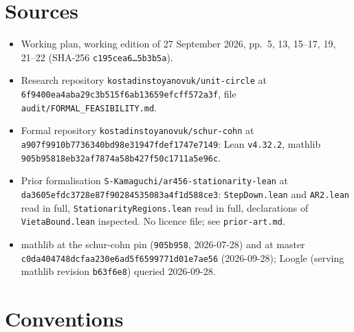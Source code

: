 \section{Sources}

\begin{itemize}
\item Working plan, working edition of 27 September 2026, pp.~5, 13, 15--17, 19,
  21--22 (SHA-256 \texttt{c195cea6\ldots5b3b5a}).
\item Research repository \texttt{kostadinstoyanovuk/unit-circle} at
  \texttt{6f9400ea4aba29c3b515f6ab13659efcff572a3f}, file
  \texttt{audit/FORMAL\_FEASIBILITY.md}.
\item Formal repository \texttt{kostadinstoyanovuk/schur-cohn} at
  \texttt{a907f9910b7736340bd98e31947fdef1747e7149}: Lean \texttt{v4.32.2},
  mathlib \texttt{905b95818eb32af7874a58b427f50c1711a5e96c}.
\item Prior formalisation \texttt{S-Kamaguchi/ar456-stationarity-lean} at
  \texttt{da3605efdc3728e87f90284535083a4f1d588ce3}: \texttt{StepDown.lean} and
  \texttt{AR2.lean} read in full, \texttt{StationarityRegions.lean} read in full,
  declarations of \texttt{VietaBound.lean} inspected. No licence file; see
  \texttt{prior-art.md}.
\item mathlib at the schur-cohn pin (\texttt{905b958}, 2026-07-28) and at
  master \texttt{c0da404748dcfaa230e6ad5f6599771d01e7ae56} (2026-09-28); Loogle
  (serving mathlib revision \texttt{b63f6e8}) queried 2026-09-28.
\end{itemize}

\section{Conventions}\label{sec:conventions}

